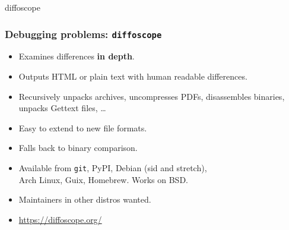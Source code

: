 \documentclass[14pt]{beamer}
\newif\ifplacelogo
\begin{document}
\placelogofalse

{

\begin{frame}{diffoscope}
 \frametitle{Debugging problems: \texttt{diffoscope}}

 \begin{itemize}
  \item Examines differences \textbf{in depth}.
  \item Outputs HTML or plain text with human readable differences.
  \item Recursively unpacks archives, uncompresses PDFs, disassembles
  binaries, unpacks Gettext files, …
  \item Easy to extend to new file formats.
  \item Falls back to binary comparison.
  \item Available from \texttt{git}, PyPI, Debian (sid and stretch), \\
   Arch Linux, Guix, Homebrew. Works on BSD.
  \item Maintainers in other distros wanted.
  \item \url{https://diffoscope.org/}
 \end{itemize}
\end{frame}


}
\end{document}
